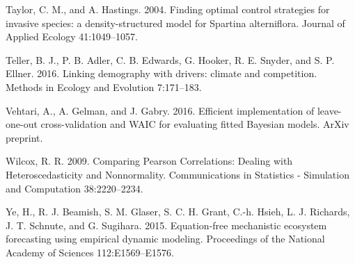 \documentclass[12pt,]{article}
\begin{document}
Taylor, C. M., and A. Hastings. 2004. Finding optimal control strategies
for invasive species: a density-structured model for Spartina
alterniflora. Journal of Applied Ecology 41:1049--1057.

Teller, B. J., P. B. Adler, C. B. Edwards, G. Hooker, R. E. Snyder, and
S. P. Ellner. 2016. Linking demography with drivers: climate and
competition. Methods in Ecology and Evolution 7:171--183.

Vehtari, A., A. Gelman, and J. Gabry. 2016. Efficient implementation of
leave-one-out cross-validation and WAIC for evaluating fitted Bayesian
models. ArXiv preprint.

Wilcox, R. R. 2009. Comparing Pearson Correlations: Dealing with
Heteroscedasticity and Nonnormality. Communications in Statistics -
Simulation and Computation 38:2220--2234.

Ye, H., R. J. Beamish, S. M. Glaser, S. C. H. Grant, C.-h. Hsieh, L. J.
Richards, J. T. Schnute, and G. Sugihara. 2015. Equation-free
mechanistic ecosystem forecasting using empirical dynamic modeling.
Proceedings of the National Academy of Sciences 112:E1569--E1576.
\end{document}
